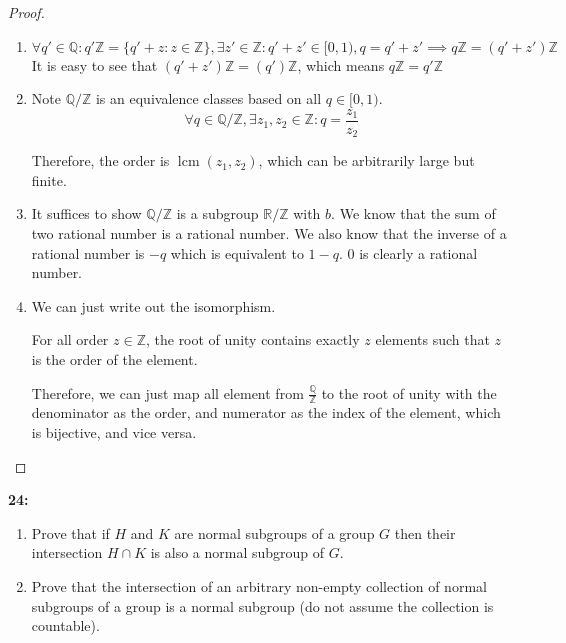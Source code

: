 \documentclass[11pt]{article}
\newcommand{\Q}{\mathbb{Q}}
\newcommand{\R}{\mathbb{R}}
\newcommand{\Z}{\mathbb{Z}}
\newenvironment{exercise}[1]
	{\noindent \textbf{#1:}}
	{\par \vspace{0.5\baselineskip}}
\begin{document}
\begin{proof}
	\begin{enumerate}[label=\emph{\alph*}]
		\item \[
			      \forall q' \in \Q: q'\Z = \{q'+z : z \in \Z\}, \exists z' \in \Z: q'+z' \in [0,1), q = q'+z' \implies q\Z = (q'+z')\Z
		      \]
		      It is easy to see that $(q'+z')\Z = (q')\Z$, which means $q\Z=q'\Z$
		\item Note $\Q/\Z$ is an equivalence classes based on all $q \in [0,1)$.
		      \[
			      \forall q \in \Q/\Z, \exists z_1,z_2 \in \Z: q = \frac{z_1}{z_2}
		      \]

		      Therefore, the order is $\operatorname{lcm} (z_1,z_2)$, which can be arbitrarily large but finite.

		\item It suffices to show $\Q/\Z$ is a subgroup $\R/\Z$ with $b$.
		      We know that the sum of two rational number is a rational number.
		      We also know that the inverse of a rational number is $-q$ which is equivalent to $1-q$.
		      $0$ is clearly a rational number.
		\item We can just write out the isomorphism.

		      For all order $z \in \Z$, the root of unity contains exactly $z$ elements such that $z$ is the order of the element.

		      Therefore, we can just map all element from $\frac{\Q}{\Z}$ to the root of unity with the denominator as the order,
		      and numerator as the index of the element, which is bijective, and vice versa.

	\end{enumerate}
\end{proof}

\begin{exercise}{24}
	\begin{enumerate}[label=\emph{\alph*}]
		\item \textsf{Prove that if \(H\) and \(K\) are normal subgroups of a group \(G\) then their intersection \(H \cap K\) is also a normal subgroup of \(G\).}
		\item \textsf{Prove that the intersection of an arbitrary non-empty collection of normal subgroups of a group is a normal subgroup (do not assume the collection is countable).}
	\end{enumerate}
\end{exercise}{}
\end{document}
